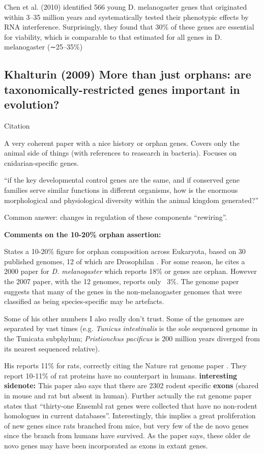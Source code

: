     Chen et al. (2010) identified 566 young D. melanogaster genes that
    originated within 3–35 million years and systematically tested their
    phenotypic effects by RNA interference. Surprisingly, they found that
    30\% of these genes are essential for viability, which is comparable to
    that estimated for all genes in D. melanogaster (∼25–35\%)

\subsection{Khalturin (2009) More than just orphans: are
taxonomically-restricted genes important in evolution?}

    Citation \cite{khalturin_more_2009}

    A very coherent paper with a nice history or orphan genes. Covers only
    the animal side of things (with references to reasearch in bacteria).
    Focuses on cnidarian-specific genes.

    ``if the key developmental control genes are the same, and if conserved
    gene families serve similar functions in different organisms, how is
    the enormous morphological and physiological diversity within the
    animal kingdom generated?''

    Common answer: changes in regulation of these components ``rewiring''.

    \textbf{Comments on the 10-20\% orphan assertion:}

    States a 10-20\% figure for orphan composition across Eukaryota, based
    on 30 published genomes, 12 of which are Drosophilan
    \cite{clark_evolution_2007}. For some reason, he cites a 2000 paper for
    \textit{D. melanogaster} which reports 18\% or genes are orphan.
    However the 2007 paper, with the 12 genomes, reports only ~3\%. The
    genome paper suggests that many of the genes in the non-melanogaster
    genomes that were classified as being species-specific may be
    artefacts.

    Some of his other numbers I also really don't trust. Some of the
    genomes are separated by vast times (e.g. \textit{Tunicus intestinalis}
    is the sole sequenced genome in the Tunicata subphylum;
    \textit{Pristionchus pacificus} is 200 million years diverged from its
    nearest sequenced relative).
    
    His reports 11\% for rats, correctly citing the Nature rat genome paper
    \cite{gibbs_genome_2004}.  They report 10-11\% of rat proteins have no
    counterpart in humans.  \textbf{interesting sidenote:} This paper also
    says that there are 2302 rodent specific \textbf{exons} (shared in
    mouse and rat but absent in human).  Further actually the rat genome
    paper states that ``thirty-one Ensembl rat genes were collected that
    have no non-rodent homologues in current databases''. Interestingly,
    this implies a great proliferation of new genes since rats branched
    from mice, but very few of the de novo genes since the branch from
    humans have survived. As the paper says, these older de novo genes may
    have been incorporated as exons in extant genes.

